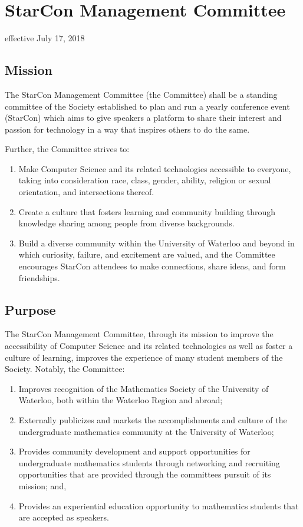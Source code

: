 \section{StarCon Management Committee}
effective July 17, 2018

\subsection{Mission}
The StarCon Management Committee (the Committee) shall be a standing committee of the Society established to plan and run a yearly conference event (StarCon) which aims to give speakers a platform to share their interest and passion for technology in a way that inspires others to do the same.

Further, the Committee strives to:
\begin{enumerate}
    \item Make Computer Science and its related technologies accessible to everyone, taking into consideration race, class, gender, ability, religion or sexual orientation, and intersections thereof.
    \item Create a culture that fosters learning and community building through knowledge sharing among people from diverse backgrounds.
    \item  Build a diverse community within the University of Waterloo and beyond in which curiosity, failure, and excitement are valued, and the Committee encourages StarCon attendees to make connections, share ideas, and form friendships.

\end{enumerate}

\subsection{Purpose}
The StarCon Management Committee, through its mission to improve the accessibility of Computer Science and its related technologies as well as foster a culture of learning, improves the experience of many student members of the Society. Notably, the Committee:

\begin{enumerate}
    \item Improves recognition of the Mathematics Society of the University of Waterloo, both within the Waterloo Region and abroad;
    \item Externally publicizes and markets the accomplishments and culture of the undergraduate mathematics community at the University of Waterloo;
    \item Provides community development and support opportunities for undergraduate mathematics students through networking and recruiting opportunities that are provided through the committees pursuit of its mission; and,
    \item Provides an experiential education opportunity to mathematics students that are accepted as speakers.
\end{enumerate}

